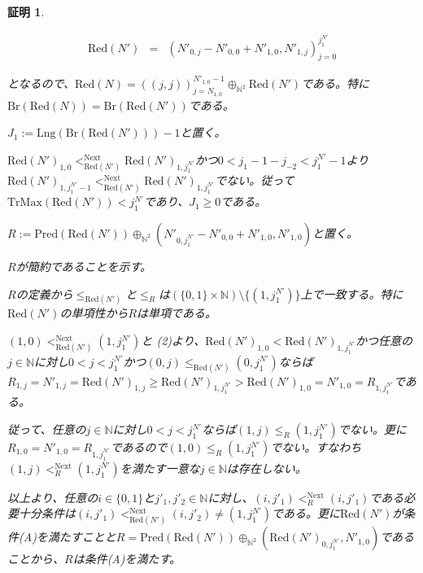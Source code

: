 \documentclass[dvipdfmx,uplatex]{jsarticle}
\theoremstyle{customnonumberbreakfortheorem}
\theoremstyle{customnonumberbreakforproof}
\newtheorem{hideableproof}{証明}
\begin{document}
\begin{hideableproof}
\begin{indented}
\begin{eqnarray*}
		\textrm{Red}(N') & = & (N'_{0,j}-N'_{0,0}+N'_{1,0},N'_{1,j})_{j=0}^{j_1^{N'}}
		\end{eqnarray*}
		\item となるので、\(\textrm{Red}(N) = ((j,j))_{j=N_{1,0}}^{N'_{1,0}-1} \oplus_{\mathbb{N}^2} \textrm{Red}(N')\)である。特に\(\textrm{Br}(\textrm{Red}(N)) = \textrm{Br}(\textrm{Red}(N'))\)である。
		\item \(J_1 := \textrm{Lng}(\textrm{Br}(\textrm{Red}(N')))-1\)と置く。
		\item \(\textrm{Red}(N')_{1,0} <_{\textrm{Red}(N')}^{\textrm{Next}} \textrm{Red}(N')_{1,j_1^{N'}}\)かつ\(0 < j_1-1-j_{-2} < j_1^{N'}-1\)より\(\textrm{Red}(N')_{1,j_1^{N'}-1} <_{\textrm{Red}(N')}^{\textrm{Next}} \textrm{Red}(N')_{1,j_1^{N'}}\)でない。従って\(\textrm{TrMax}(\textrm{Red}(N')) < j_1^{N'}\)であり、\(J_1 \geq 0\)である。
		\item
		\item \(R := \textrm{Pred}(\textrm{Red}(N')) \oplus_{\mathbb{N}^2} (N'_{0,j_1^{N'}}-N'_{0,0}+N'_{1,0},N'_{1,0})\)と置く。
		\item \(R\)が簡約であることを示す。
		\item \(R\)の定義から\(\leq_{\textrm{Red}(N')}\)と\(\leq_R\)は\((\{0,1\} \times \mathbb{N}) \setminus \{(1,j_1^{N'})\}\)上で一致する。特に\(\textrm{Red}(N')\)の単項性から\(R\)は単項である。
		\item \((1,0) <_{\textrm{Red}(N')}^{\textrm{Next}} (1,j_1^{N'})\)と (2)より、\(\textrm{Red}(N')_{1,0} < \textrm{Red}(N')_{1,j_1^{N'}}\)かつ任意の\(j \in \mathbb{N}\)に対し\(0 < j < j_1^{N'}\)かつ\((0,j) \leq_{\textrm{Red}(N')} (0,j_1^{N'})\)ならば\(R_{1,j} = N'_{1,j} = \textrm{Red}(N')_{1,j} \geq \textrm{Red}(N')_{1,j_1^{N'}} > \textrm{Red}(N')_{1,0} = N'_{1,0} = R_{1,j_1^{N'}}\)である。
		\item 従って、任意の\(j \in \mathbb{N}\)に対し\(0 < j < j_1^{N'}\)ならば\((1,j) \leq_R (1,j_1^{N'})\)でない。更に\(R_{1,0} = N'_{1,0} = R_{1,j_1^{N'}}\)であるので\((1,0) \leq_R (1,j_1^{N'})\)でない。すなわち\((1,j) <_R^{\textrm{Next}} (1,j_1^{N'})\)を満たす一意な\(j \in \mathbb{N}\)は存在しない。
		\item 以上より、任意の\(i \in \{0,1\}\)と\(j'_1,j'_2 \in \mathbb{N}\)に対し、\((i,j'_1) <_R^{\textrm{Next}} (i,j'_1)\)である必要十分条件は\((i,j'_1) <_{\textrm{Red}(N')}^{\textrm{Next}} (i,j'_2) \neq (1,j_1^{N'})\)である。更に\(\textrm{Red}(N')\)が条件(A)を満たすことと\(R = \textrm{Pred}(\textrm{Red}(N')) \oplus_{\mathbb{N}^2} (\textrm{Red}(N')_{0,j_1^{N'}},N'_{1,0})\)であることから、\(R\)は条件(A)を満たす。

\end{indented}
\end{hideableproof}
\end{document}

